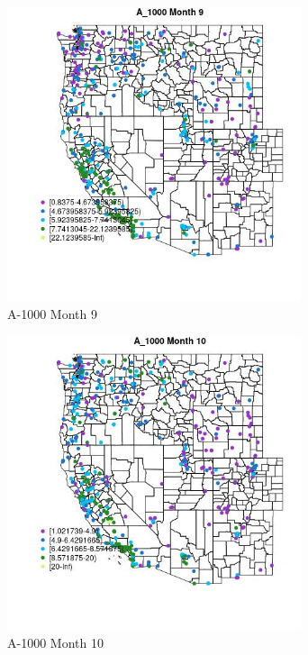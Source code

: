 \begin{figure} 
\centering  
\includegraphics[width=0.77\textwidth]{Code_Outputs/ML_input_report_ML_input_PM25_Step5_part_d_de_duplicated_aves_ML_input_MapObsMo9A_1000.jpg} 
\caption{\label{fig:ML_input_report_ML_input_PM25_Step5_part_d_de_duplicated_aves_ML_inputMapObsMo9A_1000}A-1000 Month 9} 
\end{figure} 
 

\clearpage 

\begin{figure} 
\centering  
\includegraphics[width=0.77\textwidth]{Code_Outputs/ML_input_report_ML_input_PM25_Step5_part_d_de_duplicated_aves_ML_input_MapObsMo10A_1000.jpg} 
\caption{\label{fig:ML_input_report_ML_input_PM25_Step5_part_d_de_duplicated_aves_ML_inputMapObsMo10A_1000}A-1000 Month 10} 
\end{figure} 
 


